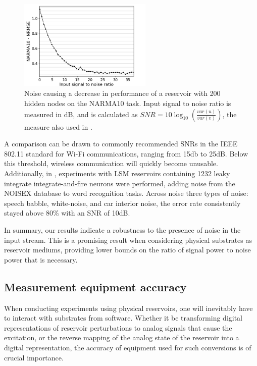 \begin{figure}
  \centering
  \includegraphics[width=2.5in]{img/input_noise_snr.png}
  \caption{
    Noise causing a decrease in performance of a reservoir with 200 hidden nodes
on the NARMA10 task. Input signal to noise ratio is measured in dB, and is
calculated as $SNR = 10\log_{10}(\frac{var(u)}{var(v)})$, the measure also used
in \cite{dambre_information_2012}.
  }
  \label{input_noise_snr}
\end{figure}

A comparison can be drawn to commonly recommended SNRs in the IEEE 802.11
standard for Wi-Fi communications, ranging from 15db to 25dB. Below this
threshold, wireless communication will quickly become unusable. Additionally, in
\cite{verstraeten_isolated_2005}, experiments with LSM reservoirs containing
1232 leaky integrate integrate-and-fire neurons were performed, adding noise
from the NOISEX database to word recognition tasks. Across noise three types of
noise: speech babble, white-noise, and car interior noise, the error rate
consistently stayed above 80\% with an SNR of 10dB.

In summary, our results indicate a robustness to the presence of noise in the
input stream. This is a promising result when considering physical substrates as
reservoir mediums, providing lower bounds on the ratio of signal power to noise
power that is necessary.

\subsection{Measurement equipment accuracy}

When conducting experiments using physical reservoirs, one will inevitably have
to interact with substrates from software. Whether it be transforming digital
representations of reservoir perturbations to analog signals that cause the
excitation, or the reverse mapping of the analog state of the reservoir into a
digital representation, the accuracy of equipment used for such conversions is
of crucial importance.

